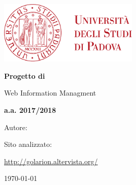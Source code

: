 \begin{titlepage} 
	\centering
	\includegraphics[width=0.50\textwidth]{img/logo.pdf}\par\vspace{1cm} %
	
	{\LARGE\bfseries Progetto di \par Web Information Managment \par}
	\vspace{1cm}
	
	{\Large\bfseries a.a. 2017/2018 \par}
	
	\vspace{1cm} 

	Autore: \par
	{\bfseries \authorName \par} 
	
	\vspace{1cm}


    Sito analizzato: \par
	\url{http://golarion.altervista.org/}

    \vfill
	
	{\large \today\par}
	
\end{titlepage}